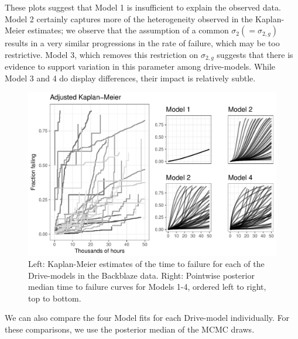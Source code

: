 \documentclass[12pt]{article}
\begin{document}
These plots suggest that Model 1 is insufficient to explain the observed data. Model 2 certainly captures more of the heterogeneity observed in the Kaplan-Meier estimates; we observe that the assumption of a common $\sigma_2(=\sigma_{2,g})$ results in a very similar progressions in the rate of failure, which may be too restrictive. Model 3, which removes this restriction on $\sigma_{2,g}$ suggests that there is evidence to support variation in this parameter among drive-models. While Model 3 and 4 do display differences, their impact is relatively subtle.

\begin{figure}[H]
\includegraphics[width=\textwidth]{heterogeneity-compare}
\caption{Left: Kaplan-Meier estimates of the time to failure for each of the Drive-models in the Backblaze data. Right: Pointwise posterior median time to failure curves for Models 1-4, ordered left to right, top to bottom.}
\label{fig:fig2}
\end{figure}

We can also compare the four Model fits for each Drive-model individually.  For these comparisons, we use the posterior median of the MCMC draws. %
\end{document}

